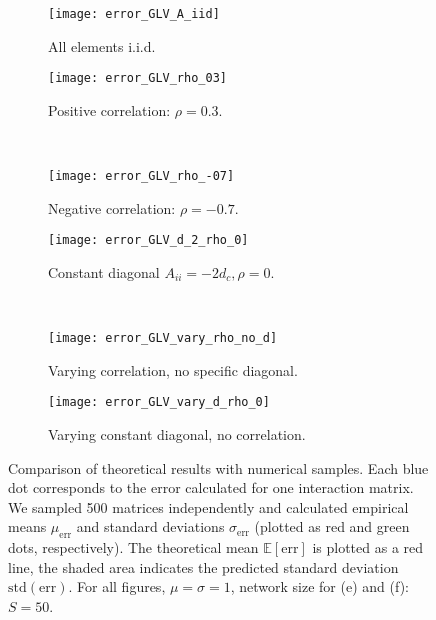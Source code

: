 \documentclass[10pt]{article}
\begin{document}
\begin{figure}[tb]
    \begin{subfigure}{.47\textwidth}
      \centering
        \texttt{[image: error\_GLV\_A\_iid]}
        \caption{ 
            All elements i.i.d.
        }
        \label{fig:A_iid}
    \end{subfigure}%
    \begin{subfigure}{.47\textwidth}
        \centering
        \texttt{[image: error\_GLV\_rho\_03]}
        \caption{
            Positive correlation:
            $\rho = 0.3$. 
        }
        \label{fig:rho_03}
    \end{subfigure} 
\vspace{0.5cm}
\\
    \begin{subfigure}{.47\textwidth}
      \centering
        \texttt{[image: error\_GLV\_rho\_-07]}
        \caption{
            Negative correlation:
            $\rho = -0.7$. 
        }
        \label{fig:rho_-07}
    \end{subfigure}
    \begin{subfigure}{.47\textwidth}
      \centering
        \texttt{[image: error\_GLV\_d\_2\_rho\_0]}
        \caption{
            Constant diagonal $A_{ii} = -2 d_c, \rho = 0$.
        }
        \label{fig:d_2_rho_0}
    \end{subfigure}
\vspace{0.5cm}
\\
    \begin{subfigure}{.47\textwidth}
        \centering
        \texttt{[image: error\_GLV\_vary\_rho\_no\_d]}
        \caption{
            Varying correlation, no specific diagonal.
        }
        \label{fig:vary_rho_no_d}
    \end{subfigure}
    \begin{subfigure}{.47\textwidth}
        \centering
        \texttt{[image: error\_GLV\_vary\_d\_rho\_0]}
        \caption{
            Varying constant diagonal, no correlation.
        }
        \label{fig:vary_d_rho_0}
    \end{subfigure}

    \caption{Comparison of theoretical results with numerical samples. 
        Each blue dot corresponds to the error calculated for one 
        interaction matrix. We sampled 500 matrices independently and 
        calculated empirical means $\mu_\mathrm{err}$ and standard deviations $\sigma_\mathrm{err}$
        (plotted as red and green dots, respectively).
        The theoretical mean $\mathbb{E}[\mathrm{err}]$ is plotted as a red line, 
        the shaded area indicates the predicted standard deviation $\mathrm{std}(\mathrm{err})$. 
    For all figures, $\mu = \sigma = 1$, network size for (e) and (f): $S = 50$.
}
    \label{fig:comparison}
\end{figure}
\end{document}
